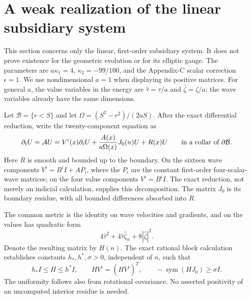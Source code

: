 \section{A weak realization of the linear subsidiary system}
\label{sec:constraint-existence}

This section concerns only the linear, first-order subsidiary system. It does
not prove existence for the geometric evolution or for its elliptic gauge.
The parameters are $a\kappa _1=4$, $\kappa _2=-99/100$, and the
Appendix-C scalar correction $\epsilon=1$. We use nondimensional $a=1$
when displaying its positive matrices. For general $a$, the value variables
in the energy are $\widehat\tau=\tau/a$ and
$\widehat\zeta=\zeta/a$; the wave variables already have the same dimensions.

Let $\mathcal B=\{r<S\}$ and let $\Omega=(S^2-r^2)/(2aS)$.
After the exact differential reduction, write the twenty-component equation as
\begin{equation}
 \partial_t U=\mathcal A U
 =V^i(x)\partial_iU+
 \frac{A(x)}{a\Omega(x)}J_0(n)U+R(x)U
 \qquad\hbox{in a collar of }\partial\mathcal B .
 \label{eq:subsidiary-abstract}
\end{equation}
Here $R$ is smooth and bounded up to the boundary. On the sixteen wave
components $V^i=B^iI+AP_i$, where the $P_i$ are the constant first-order
four-scalar-wave matrices; on the four value components $V^i=B^iI$.
The exact reduction, not merely an indicial calculation, supplies this
decomposition. The matrix $J_0$ is its boundary residue, with all bounded
differences absorbed into $R$.

The common metric is the identity on wave velocities and gradients, and on
the values has quadratic form
\begin{equation}
 4\widehat\tau^2+4\widehat\tau\widehat\zeta_n
       +8|\widehat\zeta|^2 .
 \label{eq:subsidiary-value-metric}
\end{equation}
Denote the resulting matrix by $H(n)$. The exact rational block calculation
establishes constants $h_*,h^*,\sigma>0$, independent of $n$, such that
\begin{equation}
 h_*I\le H\le h^*I,\qquad HV^i=(HV^i)^T,
 \qquad -\operatorname{sym}(HJ_0)\ge\sigma I .
 \label{eq:subsidiary-common-metric}
\end{equation}
The uniformity follows also from rotational covariance. No asserted
positivity of an uncomputed interior residue is needed.

